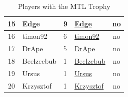 \begin{table}[ht]
\begin{tabular}{|c|l|l|l|c|}
15 & Edge & 9 & \href{https://www.warlight-mtl.com/player?playerId=7432342455}{Edge} & no \\ \hline
16 & timon92 & 6 & \href{https://www.warlight-mtl.com/player?playerId=611489923}{timon92} & no \\ \hline
17 & DrApe & 5 & \href{https://www.warlight-mtl.com/player?playerId=3442410749}{DrApe} & no \\ \hline
18 & Beelzeebub & 1 & \href{https://www.warlight-mtl.com/player?playerId=689056668}{Beelzebub} & no \\ \hline
19 & Ursus & 1 & \href{https://www.warlight-mtl.com/player?playerId=3367992188}{Ursus} & no \\ \hline
20 & Krzysztof & 1 & \href{https://www.warlight-mtl.com/player?playerId=706629919}{Krzysztof} & no \\ \hline

\end{tabular}
\caption{Players with the MTL Trophy}
\label{MTL Trophies}
\end{table}

